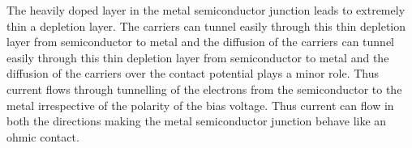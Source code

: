 \begin{frame}
  The heavily doped layer in the metal semiconductor junction leads to extremely thin a depletion layer. The carriers can tunnel easily through this thin depletion layer from semiconductor to metal and the diffusion of the carriers can tunnel easily through this thin depletion layer from semiconductor to metal and the diffusion of the carriers over the contact potential plays a minor role.  Thus current flows through tunnelling of the electrons from the semiconductor to the metal irrespective of the polarity of the bias voltage. Thus current can flow in both the directions making the metal semiconductor junction behave like an ohmic contact.

\end{frame}